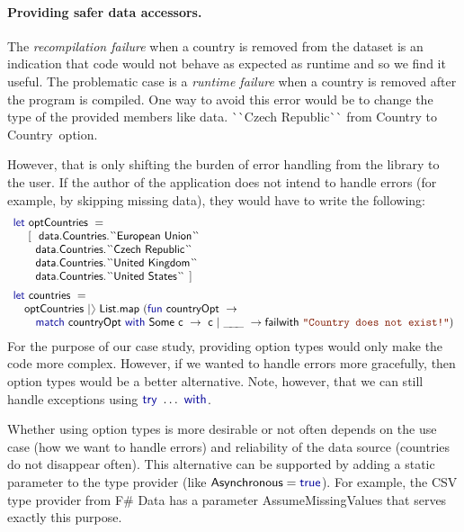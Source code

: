 \documentclass[submission,copyright,creativecommons]{eptcs}
\newcommand{\rangl}{\begin{picture}(4.5,7)
\put(.9,2.5){\rotatebox{120}{\line(1,0){5.5}}}
\put(.9,2.5){\rotatebox{240}{\line(1,0){5.5}}}
\end{picture}}
\newcommand{\ignp}{\_\kern-.5ex\_\kern-.5ex\_ }
\newcommand{\kvd}[1]{\textnormal{\textcolor{kvdclr}{\sffamily #1}}}
\newcommand{\str}[1]{\textnormal{\textcolor{strclr}{\ttfamily "#1"}}}
\newcommand{\ident}[1]{\textnormal{\sffamily #1}}
\newcommand{\lident}[1]{\textnormal{\sffamily 
  \`{}\hspace{-0.25em}\`{}\hspace{-0.1em}#1\`{}\hspace{-0.25em}\`{}}}
\begin{document}
\vspace{-1em}
\paragraph{Providing safer data accessors.} 
The \emph{recompilation failure} when a country is removed from the dataset is an indication that
code would not behave as expected as runtime and so we find it useful. The problematic case is 
a \emph{runtime failure} when a country is removed after the program is compiled. One way to 
avoid this error would be to change the type of the provided members like
\ident{data.}\lident{Czech Republic} from \ident{Country} to \ident{Country~option}. 

However, that is only shifting the burden of error handling from the library to the user. If the
author of the application does not intend to handle errors (for example, by skipping missing data),
they would have to write the following:
%
\begin{equation*}
\begin{array}{l}
 \kvd{let}~\ident{optCountries}~= \\
 \quad~\lbrack~~ \ident{data.Countries.}\lident{European Union} \\
 \qquad   \ident{data.Countries.}\lident{Czech Republic} \\
 \qquad   \ident{data.Countries.}\lident{United Kingdom} \\
 \qquad   \ident{data.Countries.}\lident{United States} ~\rbrack 
\\[0.5em]
 \kvd{let}~\ident{countries}~=\\
  \quad \ident{optCountries}~|\rangl~\ident{List.map}~(\kvd{fun}~\ident{countryOpt}~\rightarrow \\
  \qquad \kvd{match}~\ident{countryOpt}~\kvd{with}~\ident{Some~c}~\rightarrow~\ident{c}~|~\ignp~\rightarrow 
    \ident{failwith}~\str{Country does not exist!})
\end{array}
\end{equation*}
%
For the purpose of our case study, providing option types would only make the code more complex.
However, if we wanted to handle errors more gracefully, then option types would be a better 
alternative. Note, however, that we can still handle exceptions using $\kvd{try}~\ldots~\kvd{with}$.

Whether using option types is more desirable or not often depends on the use case (how we
want to handle errors) and reliability of the data source (countries do not disappear often).
This alternative can be supported by adding a static parameter to the type provider (like
$\ident{Asynchronous}=\kvd{true}$). For example, the CSV type provider from F\# Data has a 
parameter \ident{AssumeMissingValues} that serves exactly this purpose.
\end{document}
